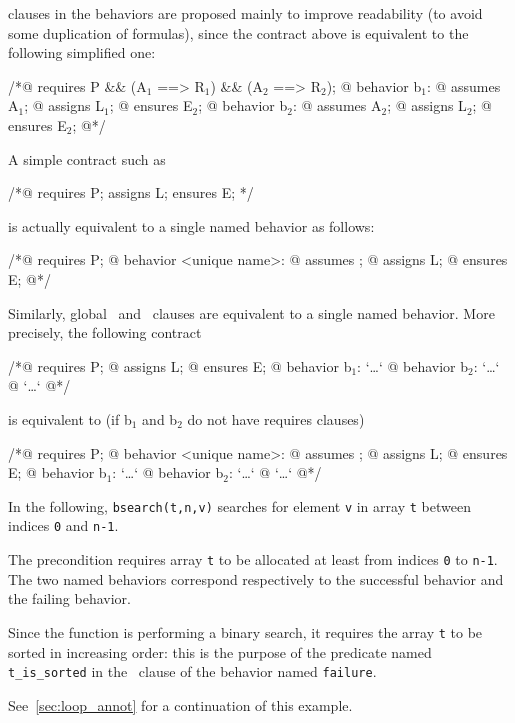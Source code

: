 \requires{} clauses in the behaviors are proposed
mainly to improve readability (to avoid some duplication of
formulas), since the contract above is equivalent to the following
simplified one:
\begin{listing}{1}
/*@ requires P && (A$_1$ ==> R$_1$) && (A$_2$ ==> R$_2$);
  @ behavior b$_1$:
  @   assumes A$_1$;
  @   assigns L$_1$;
  @   ensures E$_2$;
  @ behavior b$_2$:
  @   assumes A$_2$;
  @   assigns L$_2$;
  @   ensures E$_2$;
  @*/
\end{listing}

A simple contract such as
\begin{listing}{1}
/*@ requires P; assigns L; ensures E; */
\end{listing}
is actually equivalent to a single named behavior as follows:
\begin{listing}{1}
/*@ requires P;
  @ behavior <unique name>:
  @   assumes \true;
  @   assigns L;
  @   ensures E;
  @*/
\end{listing}
Similarly, global \assigns\ and \ensures\ clauses are equivalent to a
single named behavior. More precisely, the following contract
\begin{listing}{1}
/*@ requires P;
  @ assigns L;
  @ ensures E;
  @ behavior b$_1$: `\dots`
  @ behavior b$_2$: `\dots`
  @ `\dots`
  @*/
\end{listing}
is equivalent to (if b$_1$ and b$_2$ do not have requires clauses)
\begin{listing}{1}
/*@ requires P;
  @ behavior <unique name>:
  @   assumes \true;
  @   assigns L;
  @   ensures E;
  @ behavior b$_1$: `\dots`
  @ behavior b$_2$: `\dots`
  @ `\dots`
  @*/
\end{listing}

\begin{example}
\label{ex:bsearch}
In the following, \lstinline|bsearch(t,n,v)| searches for element \lstinline|v|
in array \lstinline|t| between indices \lstinline|0| and \lstinline|n-1|.

%
The precondition requires array \lstinline|t| to be allocated at least
from indices \lstinline|0|
to \lstinline|n-1|. The two named behaviors
correspond respectively to the successful behavior and the failing
behavior.

Since the function is performing a binary search, it requires the
array \lstinline|t| to be sorted in increasing order: this is the purpose of
the predicate named \lstinline|t_is_sorted| in the \assumes\ clause of the
behavior named \lstinline|failure|.

See~\ref{sec:loop_annot} for a continuation of this example.
\end{example}

